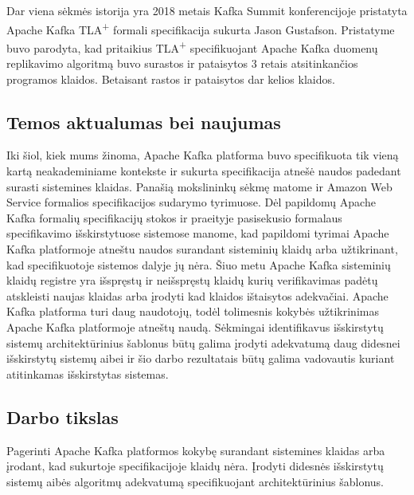 \documentclass{VUMIFPSmagistrinis}
\begin{document}
		Dar viena sėkmės istorija yra 2018 metais Kafka Summit konferencijoje pristatyta Apache Kafka TLA\textsuperscript{+} formali specifikacija sukurta Jason Gustafson\cite{kfkTla}.
		Pristatyme buvo parodyta, kad pritaikius TLA\textsuperscript{+} specifikuojant Apache Kafka duomenų replikavimo algoritmą buvo surastos ir pataisytos 3 retais atsitinkančios programos klaidos.
		Betaisant rastos ir pataisytos dar kelios klaidos.

	\subsection{Temos aktualumas bei naujumas}
		Iki šiol, kiek mums žinoma, Apache Kafka platforma buvo specifikuota tik vieną kartą\cite{kfkTla} neakademiniame kontekste ir sukurta specifikacija atnešė naudos padedant surasti sistemines klaidas.
		Panašią mokslininkų sėkmę matome ir Amazon Web Service formalios specifikacijos sudarymo tyrimuose\cite{newcombe2014use}.
		Dėl papildomų Apache Kafka formalių specifikacijų stokos ir praeityje pasisekusio formalaus specifikavimo išskirstytuose sistemose manome, kad papildomi tyrimai Apache Kafka platformoje atneštu naudos surandant sisteminių klaidų arba užtikrinant, kad specifikuotoje sistemos dalyje jų nėra.
		Šiuo metu Apache Kafka sisteminių klaidų registre\cite{kfkissue} yra išspręstų ir neišspręstų  klaidų kurių verifikavimas padėtų atskleisti naujas klaidas arba įrodyti kad klaidos ištaisytos adekvačiai.
		Apache Kafka platforma turi daug naudotojų\cite{kfk}, todėl tolimesnis kokybės užtikrinimas Apache Kafka platformoje atneštų naudą.
		Sėkmingai identifikavus išskirstytų sistemų architektūrinius šablonus\cite{hohpe2004enterprise} būtų galima įrodyti adekvatumą daug didesnei išskirstytų sistemų aibei ir šio darbo rezultatais būtų galima vadovautis kuriant atitinkamas išskirstytas sistemas. 
	
	\subsection{Darbo tikslas}
		Pagerinti Apache Kafka platformos kokybę surandant sistemines klaidas arba įrodant, kad sukurtoje specifikacijoje klaidų nėra.
		Įrodyti didesnės išskirstytų sistemų aibės algoritmų adekvatumą specifikuojant architektūrinius šablonus.
	
\end{document}
